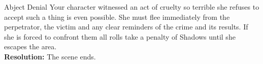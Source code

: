 \documentclass[10pt, frontgrid, backgrid]{flacards}
\begin{document}






\Cond
{Abject Denial}
{Your character witnessed an act of cruelty so terrible she refuses to accept such a thing is even possible. She must flee immediately from the perpetrator, the victim and any clear reminders of the crime and its results. If she is forced to confront them all rolls take a penalty of Shadows until she escapes the area.  \\
\textbf{Resolution:} The scene ends. 
}
\end{document}
